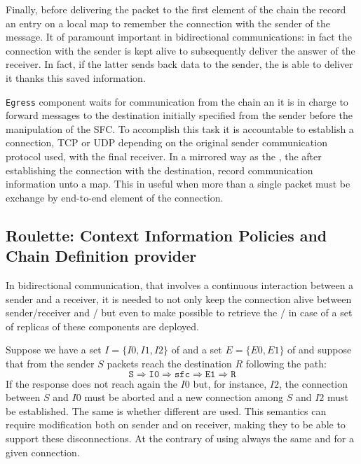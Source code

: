 Finally, before delivering the packet to the first element of the chain the
\ingress{} record an entry on a local map to remember the connection with
the sender of the message. It of paramount important in bidirectional
communications: in fact the connection with the sender is kept alive to
subsequently deliver the answer of the receiver. In fact, if the latter sends
back data to the sender, the \ingress{} is able to deliver it thanks this
saved information.

\texttt{Egress} component waits for communication from the chain an it is in
charge to forward messages to the destination initially specified from the
sender before the manipulation of the SFC. To accomplish this task it is
accountable to establish a connection, TCP or UDP depending on the original
sender communication protocol used, with the final receiver. In a mirrored way
as the \ingress{}, the \egress{} after establishing the connection with the
destination, record communication information unto a map. This in useful when
more than a single packet must be exchange by end-to-end element of the
connection.

\subsection{Roulette: Context Information Policies and Chain Definition
provider}
In bidirectional communication, that involves a continuous interaction between a
sender and a receiver, it is needed to not only keep the connection alive
between sender/receiver and \ingress{}/\egress{} but even to make possible to
retrieve the \ingress{}/\egress{} in case of a set of replicas of these
components are deployed.
\begin{exmp}
  Suppose we have a set $I=\{I0, I1, I2\}$ of \ingresses{} and a set $E=\{E0,
  E1\}$ of \egresses{} and suppose that from the sender $S$ packets reach the
  destination $R$ following the path:
  \begin{equation*}
    \texttt{S} \Longrightarrow \texttt{I0} \Longrightarrow \texttt{sfc}
    \Longrightarrow \texttt{E1} \Longrightarrow \texttt{R}
  \end{equation*}
  If the response does not reach again the \ingress{} $I0$ but, for instance,
  $I2$, the connection between $S$ and $I0$ must be aborted and a new connection
  among $S$ and $I2$ must be established. The same is whether different
  \egresses{} are used. This semantics can require modification both on sender
  and on receiver, making they to be able to support these disconnections. At
  the contrary of using always the same \ingress{} and \egress{} for a given
  connection.
\end{exmp}

